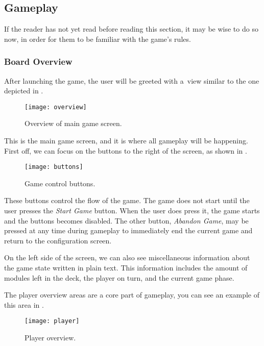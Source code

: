 \subsection{Gameplay}

If the reader has not yet read  before reading this section,
it may be wise to do so now, in order for them to be familiar with
the game's rules.

\subsubsection{Board Overview}

After launching the game, the user will be greeted with a~view similar to
the one depicted in .

\begin{figure}[ht]
\centerline{\mbox{\texttt{[image: overview]}}}
\caption{Overview of main game screen.}\label{ud:overview}
\end{figure}

This is the main game screen, and it is where all gameplay will be happening.
First off, we can focus on the buttons to the right of the screen, as shown in
.

\begin{figure}[ht]
\centerline{\mbox{\texttt{[image: buttons]}}}
\caption{Game control buttons.}\label{ud:buttons}
\end{figure}

These buttons control the flow of the game. The game does not start until the user
presses the \emph{Start Game} button. When the user does press it, the game starts
and the buttons becomes disabled. The other button, \emph{Abandon Game}, may be
pressed at any time during gameplay to immediately end the current game and return
to the configuration screen.

On the left side of the screen, we can also see miscellaneous information about the
game state written in plain text. This information includes the amount of modules
left in the deck, the player on turn, and the current game phase.

The player overview areas are a core part of gameplay, you can see an example
of this area in .

\begin{figure}[ht]
\centerline{\mbox{\texttt{[image: player]}}}
\caption{Player overview.}\label{ud:player}
\end{figure}

